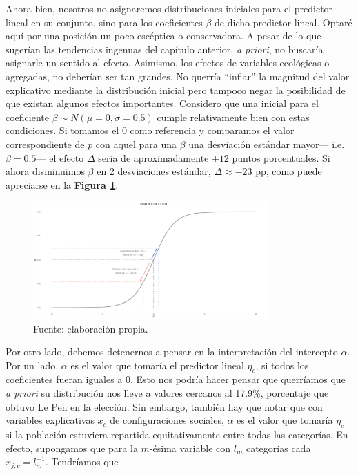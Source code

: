 Ahora bien, nosotros no asignaremos distribuciones iniciales para el predictor lineal en su conjunto, sino para los coeficientes $\beta$ de dicho predictor lineal. Optaré aquí por una posición un poco escéptica o conservadora. A pesar de lo que sugerían las tendencias ingenuas del capítulo anterior, \textit{a priori}, no buscaría asignarle un sentido al efecto. Asimismo, los efectos de variables ecológicas o agregadas, no deberían ser tan grandes. No querría ``inflar'' la magnitud del valor explicativo mediante la distribución inicial pero tampoco negar la posibilidad de que existan algunos efectos importantes. Considero que una inicial para el coeficiente $\beta\sim N(\mu=0,\sigma=0.5)$ cumple relativamente bien con estas condiciones. Si tomamos el $0$ como referencia y comparamos el valor correspondiente de $p$ con aquel para una $\beta$ una desviación estándar mayor--- i.e. $\beta = 0.5$--- el efecto $\Delta$ sería de aproximadamente $+12$ puntos porcentuales. Si ahora disminuimos $\beta$ en 2 desviaciones estándar,  $\Delta \approx -23$ pp, como puede apreciarse en la \textbf{Figura \ref{fig:Inicial_Coef}}.

\begin{figure}[h]
	\centering
	\includegraphics[width = 0.8\textwidth]{Figs/Modelado/Inicial_N0_un_medio}
	\caption{Fuente: elaboración propia.}
	\label{fig:Inicial_Coef}
\end{figure}

Por otro lado, debemos detenernos a pensar en la interpretación del intercepto $\alpha$. Por un lado, $\alpha$ es el valor que tomaría el predictor lineal $\eta_c$, si todos los coeficientes fueran iguales a $0$. Esto nos podría hacer pensar que querríamos que \textit{a priori} su distribución nos lleve a valores cercanos al  17.9\%, porcentaje que obtuvo Le Pen en la elección. Sin embargo, también hay que notar que con variables explicativas $x_c$ de configuraciones sociales, $\alpha$ es el valor que tomaría $\eta_c$ si la población estuviera repartida equitativamente entre todas las categorías. En efecto, supongamos que para la $m$-ésima variable con $l_m$ categorías cada $x_{j,c}=l_m^{-1}$. Tendríamos que

